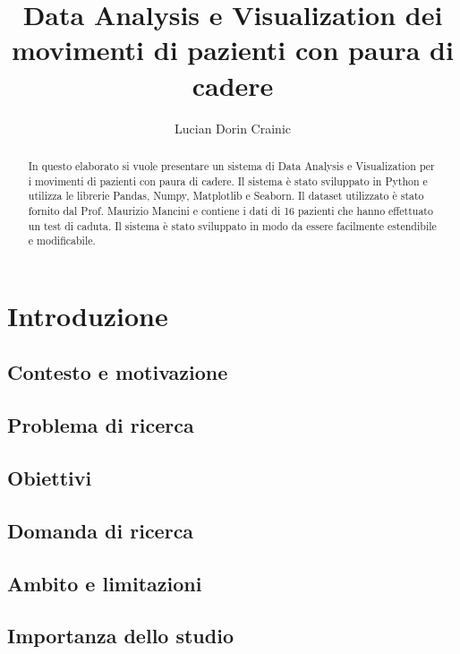 \documentclass[binding=0.6cm]{sapthesis}
\title{Data Analysis e Visualization dei movimenti di pazienti con paura di cadere}
\author{Lucian Dorin Crainic}
\begin{document}
\lstset{language=Python}

\frontmatter
\maketitle

\dedication{Audentes Fortuna iuvat \\ \emph{Virgilio, Eneide, X, 284}}

\begin{abstract}
In questo elaborato si vuole presentare un sistema di Data Analysis e Visualization 
per i movimenti di pazienti con paura di cadere. 
Il sistema è stato sviluppato in Python e utilizza le librerie Pandas, Numpy, Matplotlib e Seaborn. 
Il dataset utilizzato è stato fornito dal Prof. Maurizio Mancini e contiene i dati di 16 
pazienti che hanno effettuato un test di caduta. Il sistema è stato sviluppato in modo da essere 
facilmente estendibile e modificabile. 
\end{abstract}

\tableofcontents

\mainmatter


\chapter{Introduzione}
    \section{Contesto e motivazione}
    \section{Problema di ricerca}
    \section{Obiettivi}
    \section{Domanda di ricerca}
    \section{Ambito e limitazioni}
    \section{Importanza dello studio}
\end{document}

